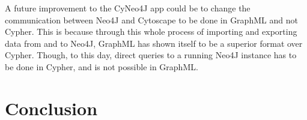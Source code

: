 A future improvement to the CyNeo4J app could be to change the communication
between Neo4J and Cytoscape to be done in GraphML and not Cypher. This is
because through this whole process of importing and exporting data from and to
Neo4J, GraphML has shown itself to be a superior format over Cypher. Though, to
this day, direct queries to a running Neo4J instance has to be done in Cypher,
and is not possible in GraphML.

\chapter{Conclusion}
